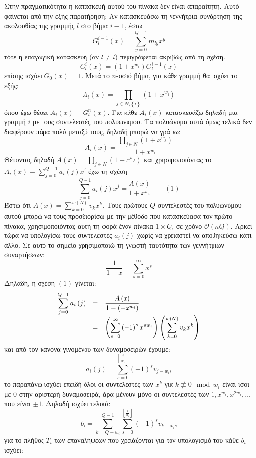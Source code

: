 \documentclass[12pt]{article}
\newcommand\bigOh{\mathcal{O}}
\begin{document}
Στην πραγματικότητα η κατασκευή αυτού του πίνακα δεν είναι απαραίτητη. Αυτό φαί\-νε\-ται από την εξής παρατήρηση: Αν κατασκευάσω τη γεννήτρια συνάρτηση της ακολουθίας της γραμμής $l$ στο βήμα $i-1$, έστω
$$G_l^{i-1}\left(x\right)=\sum_{y=0}^{Q-1}m_{ly}x^y$$
τότε η επαγωγική κατασκευή (αν $l\neq i$) περιγράφεται ακριβώς από τη σχέση:
$$G_l^i\left(x\right)=\left(1+x^{w_i}\right)G_l^{i-1}\left(x\right)$$
επίσης ισχύει $G_0\left(x\right)=1$. Μετά το $n$-οστό βήμα, για κάθε γραμμή θα ισχύει το εξής:
$$A_i\left(x\right)=\prod_{j\in N\setminus\left\{i\right\}}\left(1+x^{w_j}\right)$$
όπου έχω θέσει $A_i\left(x\right)=G_i^n\left(x\right)$. Για κάθε $A_i\left(x\right)$ κατασκευάζω δηλαδή μια γραμμή $i$ με τους συντελεστές του πολυωνύμου. Τα πολυώνυμα αυτά όμως τελικά δεν διαφέρουν πάρα πολύ μεταξύ τους, δηλαδή μπορώ να γράψω:
$$A_i\left(x\right)=\frac{\prod_{j\in N}\left(1+x^{w_j}\right)}{1+x^{w_i}}$$
Θέτοντας δηλαδή $A\left(x\right)=\prod_{j\in N}\left(1+x^{w_j}\right)$ και χρησιμοποιόντας το $A_i\left(x\right)=\sum_{j=0}^{Q-1}a_i\left(j\right)x^j$ έχω τη σχέση:
$$\sum_{j=0}^{Q-1}a_i\left(j\right)x^j=\frac{A\left(x\right)}{1+x^{w_i}}\qquad(1)$$
Έστω ότι $A\left(x\right)=\sum_{k=0}^{w\left(N\right)} v_kx^k$. Τους πρώτους $Q$ συντελεστές του πολυωνύμου αυτού μπορώ να τους προσδιορίσω με την μέθοδο που κατασκεύασα τον πρώτο πίνακα, χρησιμοποιόντας αυτή τη φορά έναν πίνακα $1\times Q$, σε χρόνο $\bigOh\left(nQ\right)$. Αρκεί τώρα να υπολογίσω τους συντελεστές $a_i\left(j\right)$ χωρίς να χρειαστεί να αποθηκεύσω κάτι άλλο. Σε αυτό το σημείο χρησιμοποιώ τη γνωστή ταυτότητα των γεννήτριων συναρτήσεων:
$$\frac{1}{1-x}=\sum_{s=0}^\infty x^s$$
Δηλαδή, η σχέση $(1)$ γίνεται:
$$\begin{array}{>{\displaystyle}rc>{\displaystyle}l}\sum_{j=0}^{Q-1}a_i\left(j\right)
&=&\frac{A\left(x\right)}{1-\left(-x^{w_i}\right)}\\
&=&\left(\sum_{s=0}^\infty\left(-1\right)^sx^{sw_i}\right)\left(\sum_{k=0}^{w\left(N\right)}v_kx^k\right)\\
\end{array}$$
και από τον κανόνα γινομένου των δυναμοσειρών έχουμε:
$$a_i\left(j\right)=\sum_{s=0}^{\left\lfloor\frac{j}{w_i}\right\rfloor}\left(-1\right)^sv_{j-w_is}$$
το παραπάνω ισχύει επειδή όλοι οι συντελεστές των $x^k$ για $k\not\equiv0\mod w_i$ είναι ίσοι με $0$ στην αριστερή δυναμοσειρά, άρα μένουν μόνο οι συντελεστές των $1,x^{w_i},x^{2w_i},\ldots$ που είναι $\pm1$. Δηλαδή ισχύει τελικά:
$$b_i=\sum_{k=Q-w_i}^{Q-1}\sum_{s=0}^{\left\lfloor\frac{k}{w_i}\right\rfloor}\left(-1\right)^sv_{k-w_is}$$
για το πλήθος $T_i$ των επαναλήψεων που χρειάζονται για τον υπολογισμό του κάθε $b_i$ ισχύει:
\end{document}
